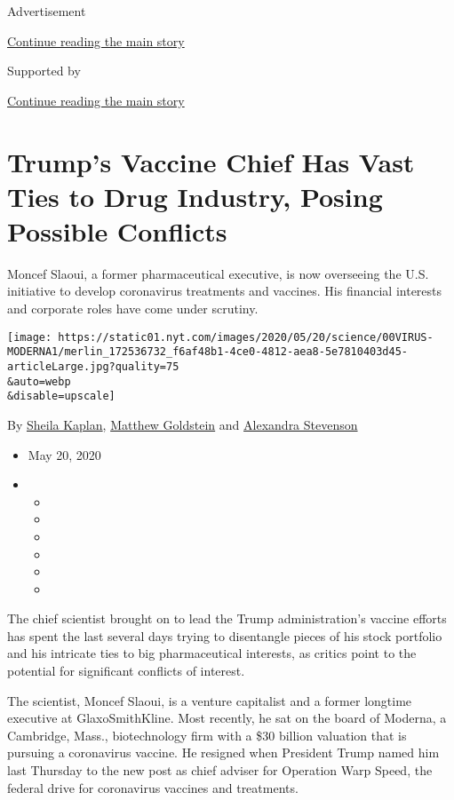 Advertisement

\protect\hyperlink{after-top}{Continue reading the main story}

Supported by

\protect\hyperlink{after-sponsor}{Continue reading the main story}

\hypertarget{trumps-vaccine-chief-has-vast-ties-to-drug-industry-posing-possible-conflicts}{%
\section{Trump's Vaccine Chief Has Vast Ties to Drug Industry, Posing
Possible
Conflicts}\label{trumps-vaccine-chief-has-vast-ties-to-drug-industry-posing-possible-conflicts}}

Moncef Slaoui, a former pharmaceutical executive, is now overseeing the
U.S. initiative to develop coronavirus treatments and vaccines. His
financial interests and corporate roles have come under scrutiny.

\texttt{[image: https://static01.nyt.com/images/2020/05/20/science/00VIRUS-MODERNA1/merlin\_172536732\_f6af48b1-4ce0-4812-aea8-5e7810403d45-articleLarge.jpg?quality=75\\\&auto=webp\\\&disable=upscale]}

By \href{https://www.nytimes.com/by/sheila-kaplan}{Sheila Kaplan},
\href{https://www.nytimes.com/by/matthew-goldstein}{Matthew Goldstein}
and \href{https://www.nytimes.com/by/alexandra-stevenson}{Alexandra
Stevenson}

\begin{itemize}
\item
  May 20, 2020
\item
  \begin{itemize}
  \item
  \item
  \item
  \item
  \item
  \item
  \end{itemize}
\end{itemize}

The chief scientist brought on to lead the Trump administration's
vaccine efforts has spent the last several days trying to disentangle
pieces of his stock portfolio and his intricate ties to big
pharmaceutical interests, as critics point to the potential for
significant conflicts of interest.

The scientist, Moncef Slaoui, is a venture capitalist and a former
longtime executive at GlaxoSmithKline. Most recently, he sat on the
board of Moderna, a Cambridge, Mass., biotechnology firm with a \$30
billion valuation that is pursuing a coronavirus vaccine. He resigned
when President Trump named him last Thursday to the new post as chief
adviser for Operation Warp Speed, the federal drive for coronavirus
vaccines and treatments.

